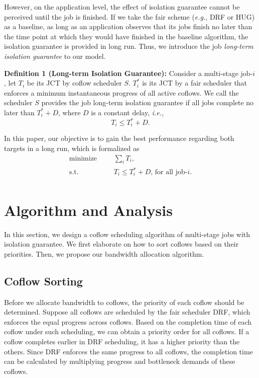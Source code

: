 \documentclass[10pt,journal,compsoc]{IEEEtran}
\begin{document}
However, on the application level, the effect of isolation guarantee cannot be perceived until the job is finished.
%
If we take the fair scheme (\emph{e.g.}, DRF\cite{DRF} or HUG\cite{HUG}) as a baseline, as long as an application observes that its jobs finish no later than the time point at which they would have finished in the baseline algorithm, the isolation guarantee is provided in long run.
%
Thus, we introduce the job \emph{long-term isolation guarantee} to our model.

\textbf{Definition 1 (Long-term Isolation Guarantee):} Consider a multi-stage job-$i$, let $T_i$ be its JCT by coflow scheduler $S$.
%
$T_i^*$ is its JCT by a fair scheduler that enforces a minimum instantaneous progress of all active coflows.
%
We call the scheduler $S$ provides the job long-term isolation guarantee if all jobs complete no later than $T_i^* + D$, where $D$ is a constant delay, \emph{i.e.},
%
\begin{equation}
	T_i \leq T_i^* + D.
\end{equation}

In this paper, our objective is to gain the best performance regarding both targets in a long run, which is formalized as
\begin{equation}
	\begin{aligned}
		\text{minimize} & & &\sum\limits_{i}T_i,\\
		\text{s.t.} & & &T_i \leq T_i^* + D \text{, for all job-}i.\\
	\end{aligned}
\end{equation}

\section{Algorithm and Analysis}\label{algorithm}
In this section, we design a coflow scheduling algorithm of multi-stage jobs with isolation guarantee.
%
We first elaborate on how to sort coflows based on their priorities.
%
Then, we propose our bandwidth allocation algorithm.

\subsection{Coflow Sorting}
Before we allocate bandwidth to coflows, the priority of each coflow should be determined.
%
Suppose all coflows are scheduled by the fair scheduler DRF, which enforces the equal progress across coflows\cite{DRF,HUG}.
%
Based on the completion time of each coflow under such scheduling, we can obtain a priority order for all coflows.
%
If a coflow completes earlier in DRF scheduling, it has a higher priority than the others.
%
Since DRF enforces the same progress to all coflows, the completion time can be calculated by multiplying progress and bottleneck demands of these coflows.
\end{document}
